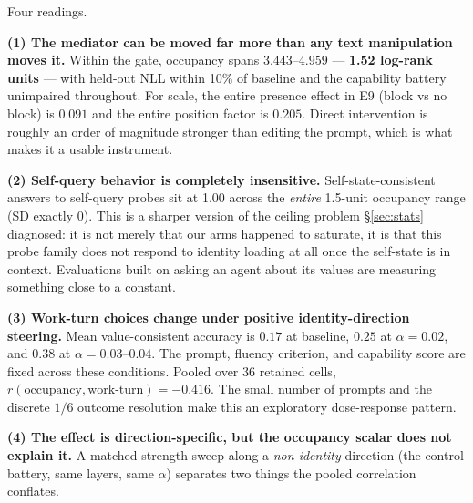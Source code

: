 \documentclass[11pt]{article}
\begin{document}
Four readings.

\textbf{(1) The mediator can be moved far more than any text manipulation moves it.} Within the gate, occupancy spans $3.443$--$4.959$ --- \textbf{1.52 log-rank units} --- with held-out NLL within 10\% of baseline and the capability battery unimpaired throughout. For scale, the entire presence effect in E9 (block vs no block) is $0.091$ and the entire position factor is $0.205$. Direct intervention is roughly an order of magnitude stronger than editing the prompt, which is what makes it a usable instrument.

\textbf{(2) Self-query behavior is completely insensitive.} Self-state-consistent answers to self-query probes sit at 1.00 across the \emph{entire} 1.5-unit occupancy range (SD exactly 0). This is a sharper version of the ceiling problem \S\ref{sec:stats} diagnosed: it is not merely that our arms happened to saturate, it is that this probe family does not respond to identity loading at all once the self-state is in context. Evaluations built on asking an agent about its values are measuring something close to a constant.

\textbf{(3) Work-turn choices change under positive identity-direction steering.} Mean value-consistent accuracy is $0.17$ at baseline, $0.25$ at $\alpha{=}0.02$, and $0.38$ at $\alpha{=}0.03$--$0.04$. The prompt, fluency criterion, and capability score are fixed across these conditions. Pooled over 36 retained cells, $r(\text{occupancy}, \text{work-turn})=-0.416$. The small number of prompts and the discrete $1/6$ outcome resolution make this an exploratory dose-response pattern.

\textbf{(4) The effect is direction-specific, but the occupancy scalar does not explain it.} A matched-strength sweep along a \emph{non-identity} direction (the control battery, same layers, same $\alpha$) separates two things the pooled correlation conflates.
\end{document}
